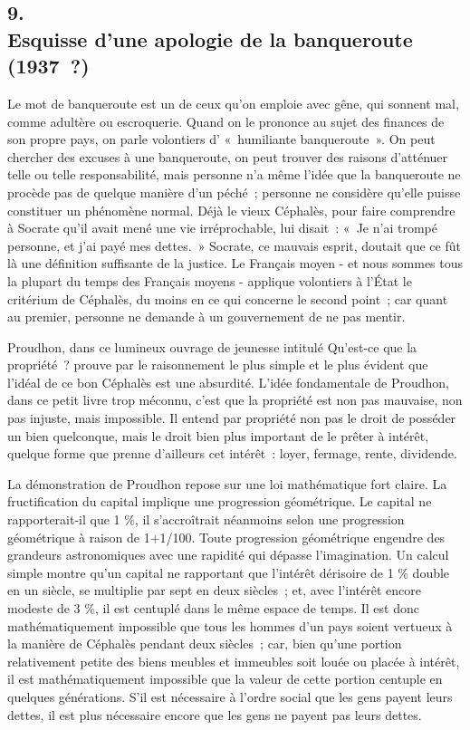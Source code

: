 \documentclass[french,twoside]{book} %
\begin{document}
\subsection[{9. Esquisse d'une apologie de la banqueroute  (1937 ?)}]{9. \\
Esquisse d'une apologie de la banqueroute \protect\footnotemark  \\
(1937 ?)}
\noindent \par
Le mot de banqueroute est un de ceux qu'on emploie avec gêne, qui sonnent mal, comme adultère ou escroquerie. Quand on le prononce au sujet des finances de son propre pays, on parle volontiers d' « humiliante banque­route ». On peut chercher des excuses à une banqueroute, on peut trouver des raisons d'atténuer telle ou telle responsabilité, mais personne n'a même l'idée que la banqueroute ne procède pas de quelque manière d'un péché ; personne ne considère qu'elle puisse constituer un phénomène normal. Déjà le vieux Céphalès, pour faire comprendre à Socrate qu'il avait mené une vie irrépro­chable, lui disait : « Je n'ai trompé personne, et j'ai payé mes dettes. » Socrate, ce mauvais esprit, doutait que ce fût là une définition suffisante de la justice. Le Français moyen - et nous sommes tous la plupart du temps des Français moyens - applique volontiers à l'État le critérium de Céphalès, du moins en ce qui concerne le second point ; car quant au premier, personne ne demande à un gouvernement de ne pas mentir.\par
Proudhon, dans ce lumineux ouvrage de jeunesse intitulé Qu'est-ce que la propriété ? prouve par le raisonnement le plus simple et le plus évident que l'idéal de ce bon Céphalès est une absurdité. L'idée fondamentale de Proud­hon, dans ce petit livre trop méconnu, c'est que la propriété est non pas mauvaise, non pas injuste, mais impossible. Il entend par propriété non pas le droit de posséder un bien quelconque, mais le droit bien plus important de le prêter à intérêt, quelque forme que prenne d'ailleurs cet intérêt : loyer, fermage, rente, dividende.\par
La démonstration de Proudhon repose sur une loi mathématique fort claire. La fructification du capital implique une progression géométrique. Le capital ne rapporterait-il que 1 \%, il s'accroîtrait néanmoins selon une pro­gression géométrique à raison de 1+1/100. Toute progression géométrique engendre des grandeurs astronomiques avec une rapidité qui dépasse l'imagi­nation. Un calcul simple montre qu'un capital ne rapportant que l'intérêt dérisoire de 1 \% double en un siècle, se multiplie par sept en deux siècles ; et, avec l'intérêt encore modeste de 3 \%, il est centuplé dans le même espace de temps. Il est donc mathématiquement impossible que tous les hommes d'un pays soient vertueux à la manière de Céphalès pendant deux siècles ; car, bien qu'une portion relativement petite des biens meubles et immeubles soit louée ou placée à intérêt, il est mathématiquement impossible que la valeur de cette portion centuple en quelques générations. S'il est nécessaire à l'ordre social que les gens payent leurs dettes, il est plus nécessaire encore que les gens ne payent pas leurs dettes.\par
\end{document}
